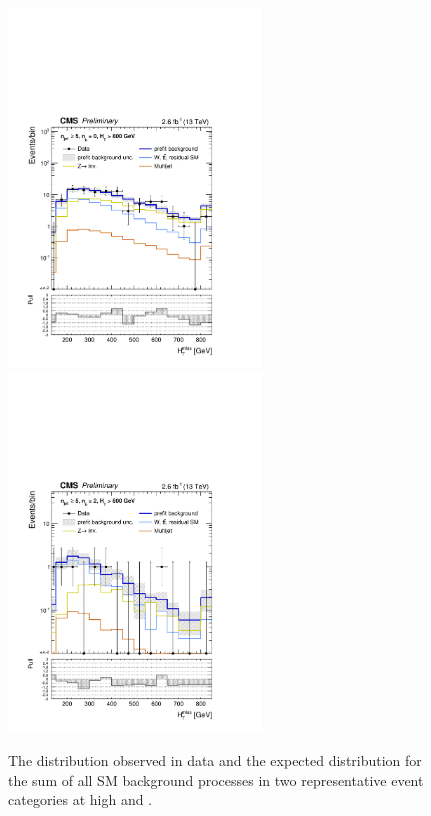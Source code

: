 \begin{figure}[tbhp]
  \begin{center}
    \includegraphics[width=0.6\textwidth]{mhtShape_eq0b_ge5j_800_Inf_prefit.pdf} 
    \includegraphics[width=0.6\textwidth]{mhtShape_eq2b_ge5j_800_Inf_prefit.pdf} \\
  \end{center}
  \caption{ The \mht distribution observed in data and the expected
    distribution for the sum of all SM background processes in two
    representative event categories at high \njet and \scalht. 
    \label{fig:mht-templates} }
\end{figure}


